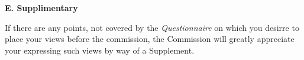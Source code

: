 \thispagestyle{empty}
{\rm 
\begin{center}
{\rm\bfseries E. Supplimentary}
\end{center}

If there are any points, not covered by the {\textit {Questionnaire}} on which you desirre to place your views before the commission, the Commission will greatly appreciate your expressing such views by way of a Supplement.}


